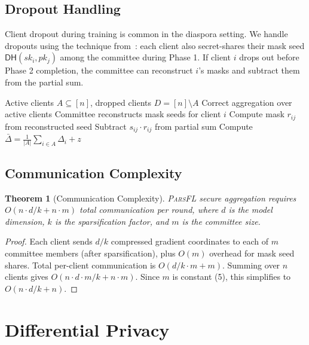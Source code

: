 \documentclass[11pt,a4paper]{article}
\newcommand{\parsfl}{\textsc{ParsFL}\xspace}
\newtheorem{theorem}{Theorem}
\begin{document}
\subsection{Dropout Handling}

Client dropout during training is common in the diaspora setting. We handle dropouts using the technique from~\citep{bonawitz2017practical}: each client also secret-shares their mask seed $\mathsf{DH}(sk_i, pk_j)$ among the committee during Phase 1. If client $i$ drops out before Phase 2 completion, the committee can reconstruct $i$'s masks and subtract them from the partial sum.

\begin{algorithm}[H]
\caption{Dropout Recovery}
\label{alg:dropout}
\begin{algorithmic}[1]
\Require Active clients $A \subseteq [n]$, dropped clients $D = [n] \setminus A$
\Ensure Correct aggregation over active clients
    \State Committee reconstructs mask seeds for client $i$
        \State Compute mask $r_{ij}$ from reconstructed seed
        \State Subtract $s_{ij} \cdot r_{ij}$ from partial sum
    \EndFor
\EndFor
\State Compute $\bar{\Delta} = \frac{1}{|A|} \sum_{i \in A} \Delta_i + z$
\end{algorithmic}
\end{algorithm}

\subsection{Communication Complexity}

\begin{theorem}[Communication Complexity]
\parsfl secure aggregation requires $O(n \cdot d / k + n \cdot m)$ total communication per round, where $d$ is the model dimension, $k$ is the sparsification factor, and $m$ is the committee size.
\end{theorem}

\begin{proof}
Each client sends $d/k$ compressed gradient coordinates to each of $m$ committee members (after sparsification), plus $O(m)$ overhead for mask seed shares. Total per-client communication is $O(d/k \cdot m + m)$. Summing over $n$ clients gives $O(n \cdot d \cdot m / k + n \cdot m)$. Since $m$ is constant (5), this simplifies to $O(n \cdot d / k + n)$.
\end{proof}

\section{Differential Privacy}
\end{document}

